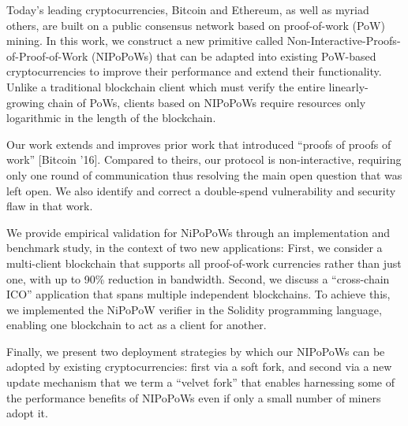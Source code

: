 Today's leading cryptocurrencies, Bitcoin and Ethereum, as well as myriad others, are built on a public consensus network based on proof-of-work (PoW) mining. In this work, we construct a new primitive called Non-Interactive-Proofs-of-Proof-of-Work (NIPoPoWs) that can be adapted into existing PoW-based cryptocurrencies to improve their performance and extend their functionality.
Unlike a traditional blockchain client
which must verify the entire linearly-growing chain of PoWs, clients based on
NIPoPoWs require resources only logarithmic in the length of the blockchain.

Our work  extends and improves prior work that introduced ``proofs of proofs of work'' [Bitcoin '16]. Compared to theirs, our protocol is non-interactive, requiring only one round of communication thus resolving the main open question that was left open. We also identify and correct a double-spend vulnerability and security flaw in that work. %

We provide empirical validation for NiPoPoWs through an implementation and benchmark study, in the context of two new applications:
First, we consider a multi-client blockchain that supports all proof-of-work currencies rather than just one, with up to 90\% reduction in bandwidth. 
Second, we discuss a ``cross-chain ICO'' application that spans multiple independent blockchains. To achieve this, we implemented the NiPoPoW verifier in the Solidity programming language, enabling one blockchain to act as a client for another.

Finally, we present two deployment strategies by which our NIPoPoWs can be adopted by existing cryptocurrencies: first via a soft fork, and second via a new update mechanism that we
term a ``velvet fork'' that enables harnessing some of the performance benefits
of NIPoPoWs even if only a small number of miners adopt it.
